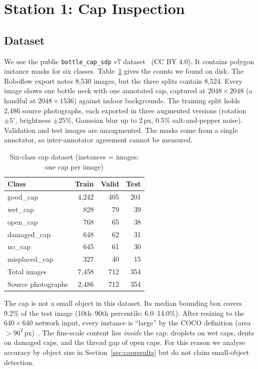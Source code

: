 \documentclass[conference]{IEEEtran}
\begin{document}
\section{Station 1: Cap Inspection}
\subsection{Dataset}
We use the public \texttt{bottle\_cap\_sdp} v7 dataset~\cite{capdata} (CC BY 4.0). It contains polygon instance masks for six classes. Table~\ref{tab:capdata} gives the counts we found on disk. The Roboflow export notes 8{,}530 images, but the three splits contain 8{,}524. Every image shows one bottle neck with one annotated cap, captured at $2048{\times}2048$ (a handful at $2048{\times}1536$) against indoor backgrounds. The training split holds 2{,}486 source photographs, each exported in three augmented versions (rotation $\pm5^\circ$, brightness $\pm25\%$, Gaussian blur up to 2\,px, 0.5\% salt-and-pepper noise). Validation and test images are unaugmented. The masks come from a single annotator, so inter-annotator agreement cannot be measured.

\begin{table}[t]
\caption{Six-class cap dataset (instances = images; one cap per image)}
\label{tab:capdata}
\centering
\begin{tabular}{lrrr}
\toprule
Class & Train & Valid & Test\\
\midrule
good\_cap & 4{,}242 & 405 & 201\\
wet\_cap & 828 & 79 & 39\\
open\_cap & 768 & 65 & 38\\
damaged\_cap & 648 & 62 & 31\\
no\_cap & 645 & 61 & 30\\
misplaced\_cap & 327 & 40 & 15\\
\midrule
Total images & 7{,}458 & 712 & 354\\
Source photographs & 2{,}486 & 712 & 354\\
\bottomrule
\end{tabular}
\end{table}

The cap is not a small object in this dataset. Its median bounding box covers 9.2\% of the test image (10th--90th percentile: 6.0--14.0\%). After resizing to the $640{\times}640$ network input, every instance is ``large'' by the COCO definition (area $>96^2$\,px)~\cite{coco}. The fine-scale content lies \emph{inside} the cap: droplets on wet caps, dents on damaged caps, and the thread gap of open caps. For this reason we analyse accuracy by object size in Section~\ref{sec:capresults} but do not claim small-object detection.
\end{document}
